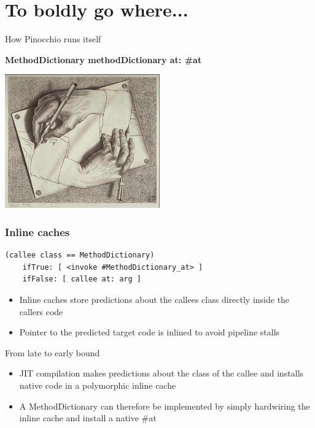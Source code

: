 \documentclass{beamer}
\begin{document}
\section{To boldly go where...}

\begin{frame}{How Pinocchio runs itself}

    {\bf MethodDictionary methodDictionary at: \#at}

    \begin{center}\includegraphics[width=0.5\textwidth]{escher.jpg}\end{center}
\end{frame}

\begin{frame}[fragile]
    \frametitle{Inline caches}

    \begin{lstlisting}
(callee class == MethodDictionary)
    ifTrue: [ <invoke #MethodDictionary_at> ]
    ifFalse: [ callee at: arg ]
    \end{lstlisting}

    \begin{itemize}
        \item Inline caches store predictions about the callees class directly inside the callers code
        \item Pointer to the predicted target code is inlined to avoid pipeline stalls
    \end{itemize}
\end{frame}

\begin{frame}{From late to early bound}
        \begin{itemize}
            \item JIT compilation makes predictions about the class of the callee and installs native code in a polymorphic inline cache
            \item A MethodDictionary can therefore be implemented by simply hardwiring the inline cache and install a native \#at
        \end{itemize}
\end{frame}
\end{document}
